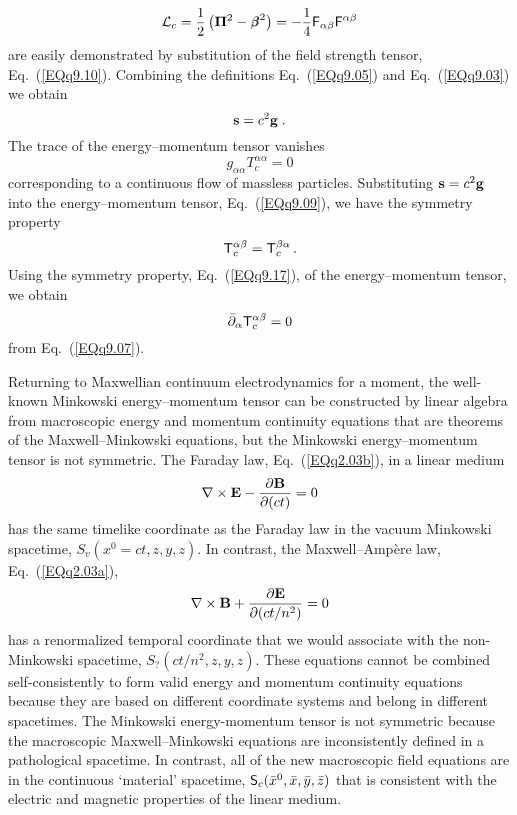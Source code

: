 \documentclass[twocolumn,amssymb,eqsecnum,aps,pra]{revtex4-2}
\begin{document}
\begin{equation}
{\cal L}_c=\frac{1}{2}\left ( {\bf \Pi}^2-{{\beta}\hskip -5.6pt {\beta}}^2\right )
= -\frac{1}{4} {\sf F}_{\alpha\beta}{\sf F}^{\alpha\beta}
\label{EQq9.14}
\end{equation}
are easily demonstrated by substitution of the field strength
tensor, Eq.~(\ref{EQq9.10}).
Combining the definitions Eq.~(\ref{EQq9.05}) and
Eq.~(\ref{EQq9.03}) we obtain 
\begin{equation}
{\bf s}=c^2{\bf g} \; .
\label{EQq9.15}
\end{equation}
The trace of the energy--momentum tensor vanishes
\begin{equation}
g_{\alpha\alpha} T_c^{\alpha\alpha}=0
\label{EQq9.16}
\end{equation}
corresponding to a continuous flow of massless particles.
Substituting ${\bf s}=c^2{\bf g}$ into the energy--momentum tensor,
Eq.~(\ref{EQq9.09}), we have the symmetry property
\begin{equation}
{\sf T}_c^{\alpha\beta} = {\sf T}_c^{\beta\alpha} \, .
\label{EQq9.17}
\end{equation}
Using the symmetry property, Eq.~(\ref{EQq9.17}), of the
energy--momentum tensor, we obtain
\begin{equation}
\bar \partial_{\alpha} {\sf T}_c^{\alpha\beta} =0
\label{EQq9.18}
\end{equation}
from Eq.~(\ref{EQq9.07}).
\par
Returning to Maxwellian continuum electrodynamics for a moment,
the well-known Minkowski energy--momentum tensor can be constructed
by linear algebra from macroscopic energy and momentum continuity
equations that are theorems of the Maxwell--Minkowski equations,
but the Minkowski energy--momentum tensor is not symmetric.
The Faraday law, Eq.~(\ref{EQq2.03b}), in a linear medium 
\begin{equation}
\nabla\times{\bf E} -\frac{\partial{\bf B}}{\partial (ct)} =0
\label{EQq9.19}
\end{equation}
has the same timelike coordinate as the Faraday law in the vacuum
Minkowski spacetime, $S_v(x^0=ct,z,y,z)$.
In contrast, the Maxwell--Amp\`ere law, Eq.~(\ref{EQq2.03a}),
\begin{equation}
\nabla\times{\bf B} +\frac{\partial {\bf E}}{\partial (ct/n^2)} =0 
\label{EQq9.20}
\end{equation}
has a renormalized temporal coordinate that we would associate with
the non-Minkowski spacetime, $S_{?}(ct/n^2,z,y,z)$.
These equations cannot be combined self-consistently to form valid
energy and momentum continuity equations because they are based on
different coordinate systems and belong in different spacetimes.
The Minkowski energy-momentum tensor is not symmetric because
the macroscopic Maxwell--Minkowski equations are inconsistently
defined in a pathological spacetime.
In contrast, all of the new macroscopic field equations are in the
continuous `material' spacetime,
${\sf S}_c(\bar x^0,\bar x,\bar y,\bar z)$ that is consistent with
the electric and magnetic properties of the linear medium.
\par
\end{document}
